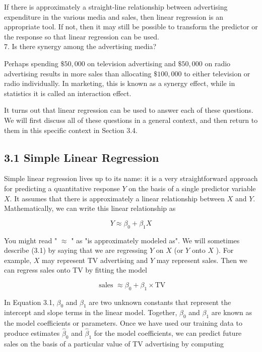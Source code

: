 \documentclass[10pt]{article}
\begin{document}
If there is approximately a straight-line relationship between advertising expenditure in the various media and sales, then linear regression is an appropriate tool. If not, then it may still be possible to transform the predictor or the response so that linear regression can be used.\\
7. Is there synergy among the advertising media?

Perhaps spending $\$ 50,000$ on television advertising and $\$ 50,000$ on radio advertising results in more sales than allocating $\$ 100,000$ to either television or radio individually. In marketing, this is known as a synergy effect, while in statistics it is called an interaction effect.

It turns out that linear regression can be used to answer each of these questions. We will first discuss all of these questions in a general context, and then return to them in this specific context in Section 3.4.

\subsection*{3.1 Simple Linear Regression}
Simple linear regression lives up to its name: it is a very straightforward approach for predicting a quantitative response $Y$ on the basis of a single predictor variable $X$. It assumes that there is approximately a linear relationship between $X$ and $Y$. Mathematically, we can write this linear relationship as


\begin{equation*}
Y \approx \beta_{0}+\beta_{1} X \tag{3.1}
\end{equation*}


You might read " $\approx$ " as "is approximately modeled as". We will sometimes describe (3.1) by saying that we are regressing $Y$ on $X$ (or $Y$ onto $X$ ). For example, $X$ may represent TV advertising and $Y$ may represent sales. Then we can regress sales onto TV by fitting the model

$$
\text { sales } \approx \beta_{0}+\beta_{1} \times \mathrm{TV}
$$

In Equation 3.1, $\beta_{0}$ and $\beta_{1}$ are two unknown constants that represent the intercept and slope terms in the linear model. Together, $\beta_{0}$ and $\beta_{1}$ are known as the model coefficients or parameters. Once we have used our training data to produce estimates $\hat{\beta}_{0}$ and $\hat{\beta}_{1}$ for the model coefficients, we can predict future sales on the basis of a particular value of TV advertising by computing
\end{document}
